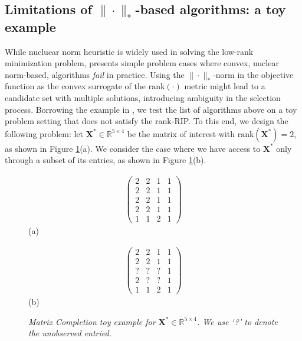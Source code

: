 \documentclass[twocolumn]{svjour3}
\newcommand{\vectornormbig}[1]{\big\|#1\big\|}
\newcommand{\bestsignal}{\boldsymbol{X}^\ast}
\begin{document}
\subsection{Limitations of $\vectornormbig{\cdot}_{\ast}$-based algorithms: a toy example}

While nucluear norm heuristic is widely used in solving the low-rank minimization problem, \cite{nonuclear} presents simple problem cases where convex, nuclear norm-based, algorithms {\it fail} in practice. Using the  $\vectornormbig{\cdot}_{\ast}$-norm in the objective function as the convex surrogate of the $\text{rank}(\cdot)$ metric might lead to a candidate set with multiple solutions, introducing ambiguity in the selection process. Borrowing the example in \cite{nonuclear}, we test the list of algorithms above on a toy problem setting that does not satisfy the rank-RIP. To this end, we design the following problem: let $\bestsignal \in \mathbb{R}^{5 \times 4}$ be the matrix of interest with $\text{rank}(\bestsignal) = 2$, as shown in Figure \ref{fig:toy}(a). We consider the case where we have access to $\bestsignal $ only through a subset of its entries, as shown in Figure \ref{fig:toy}(b).


\begin{figure}[ht]
\begin{center}
\begin{minipage}[c]{0.25\linewidth}
\begin{align}
\left( \begin{array}{cccc}
2 & 2 & 1 & 1 \\
2 & 2 & 1 & 1 \\
2 & 2 & 1 & 1 \\
2 & 2 & 1 & 1 \\
1 & 1 & 2 & 1 \end{array} \right) \nonumber 
\end{align} \hspace{0.6cm} (a)
\end{minipage}
\hspace{-0.5cm}
\begin{minipage}[c]{0.25\linewidth}
\begin{align}
\left( \begin{array}{cccc}
2 & 2 & 1 & 1 \\
2 & 2 & 1 & 1 \\
? & ? & ? & 1 \\
2 & ? & ? & 1 \\
1 & 1 & 2 & 1 \end{array} \right) \nonumber 
\end{align} \hspace{0.6cm}  (b)
\end{minipage}
\end{center}
\caption{\small\sl Matrix Completion toy example for $ \bestsignal \in \mathbb{R}^{5 \times 4}$. We use `?' to denote the unobserved entried. } \label{fig:toy}
\end{figure}
\end{document}
